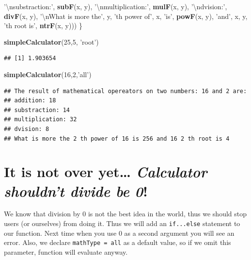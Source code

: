 \documentclass[]{book}
\newenvironment{Shaded}{\begin{snugshade}}{\end{snugshade}}
\newcommand{\KeywordTok}[1]{\textcolor[rgb]{0.13,0.29,0.53}{\textbf{#1}}}
\newcommand{\DecValTok}[1]{\textcolor[rgb]{0.00,0.00,0.81}{#1}}
\newcommand{\CharTok}[1]{\textcolor[rgb]{0.31,0.60,0.02}{#1}}
\newcommand{\StringTok}[1]{\textcolor[rgb]{0.31,0.60,0.02}{#1}}
\newcommand{\NormalTok}[1]{#1}
\theoremstyle{definition}
\theoremstyle{definition}
\theoremstyle{definition}
\theoremstyle{remark}
\begin{document}
\begin{Shaded}
\begin{Highlighting}[]
                      \StringTok{'}\CharTok{\textbackslash{}n}\StringTok{substraction:'}\NormalTok{, }\KeywordTok{subF}\NormalTok{(x, y), }\StringTok{'}\CharTok{\textbackslash{}n}\StringTok{multiplication:'}\NormalTok{, }\KeywordTok{mulF}\NormalTok{(x, y),}
                      \StringTok{'}\CharTok{\textbackslash{}n}\StringTok{dvision:'}\NormalTok{, }\KeywordTok{divF}\NormalTok{(x, y), }\StringTok{'}\CharTok{\textbackslash{}n}\StringTok{What is more the'}\NormalTok{, y,}
                      \StringTok{'th power of'}\NormalTok{, x, }\StringTok{'is'}\NormalTok{, }\KeywordTok{powF}\NormalTok{(x, y), }\StringTok{'and'}\NormalTok{, x, y,}
                      \StringTok{'th root is'}\NormalTok{, }\KeywordTok{ntrF}\NormalTok{(x, y)))}
\NormalTok{\}}

\KeywordTok{simpleCalculator}\NormalTok{(}\DecValTok{25}\NormalTok{,}\DecValTok{5}\NormalTok{, }\StringTok{'root'}\NormalTok{)}
\end{Highlighting}
\end{Shaded}

\begin{verbatim}
## [1] 1.903654
\end{verbatim}

\begin{Shaded}
\begin{Highlighting}[]
\KeywordTok{simpleCalculator}\NormalTok{(}\DecValTok{16}\NormalTok{,}\DecValTok{2}\NormalTok{,}\StringTok{'all'}\NormalTok{)}
\end{Highlighting}
\end{Shaded}

\begin{verbatim}
## The result of mathematical opereators on two numbers: 16 and 2 are: 
## addition: 18 
## substraction: 14 
## multiplication: 32 
## dvision: 8 
## What is more the 2 th power of 16 is 256 and 16 2 th root is 4
\end{verbatim}

\section{\texorpdfstring{It is not over yet\ldots{} \emph{Calculator
shouldn't divide be
0}!}{It is not over yet\ldots{} Calculator shouldn't divide be 0!}}\label{it-is-not-over-yet-calculator-shouldnt-divide-be-0}

We know that division by 0 is not the best idea in the world, thus we
should stop users (or ourselves) from doing it. Thus we will add an
\texttt{if...else} statement to our function. Next time when you use 0
as a second argument you will see an error. Also, we declare
\texttt{mathType\ =\ \textquotesingle{}all\textquotesingle{}} as a
default value, so if we omit this parameter, function will evaluate
anyway.
\end{document}
